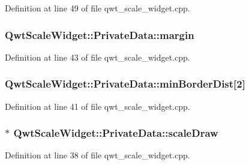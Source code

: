 Definition at line 49 of file qwt\-\_\-scale\-\_\-widget.\-cpp.

\hypertarget{class_qwt_scale_widget_1_1_private_data_a2fa5969894150a7b44ebbbcd8f8d7407}{
\subsubsection[{margin}]{ Qwt\-Scale\-Widget\-::\-Private\-Data\-::margin}}\label{class_qwt_scale_widget_1_1_private_data_a2fa5969894150a7b44ebbbcd8f8d7407}


Definition at line 43 of file qwt\-\_\-scale\-\_\-widget.\-cpp.

\hypertarget{class_qwt_scale_widget_1_1_private_data_aea6a4d25b175ab83c725ab68220fd9d7}{
\subsubsection[{min\-Border\-Dist}]{ Qwt\-Scale\-Widget\-::\-Private\-Data\-::min\-Border\-Dist\mbox{[}2\mbox{]}}}\label{class_qwt_scale_widget_1_1_private_data_aea6a4d25b175ab83c725ab68220fd9d7}


Definition at line 41 of file qwt\-\_\-scale\-\_\-widget.\-cpp.

\hypertarget{class_qwt_scale_widget_1_1_private_data_af1987ab59f2a5dfb963573657e58a869}{
\subsubsection[{scale\-Draw}]{$\ast$ Qwt\-Scale\-Widget\-::\-Private\-Data\-::scale\-Draw}}\label{class_qwt_scale_widget_1_1_private_data_af1987ab59f2a5dfb963573657e58a869}


Definition at line 38 of file qwt\-\_\-scale\-\_\-widget.\-cpp.

